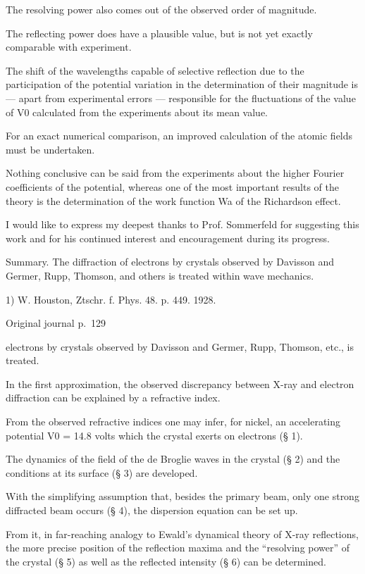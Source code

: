 \documentclass[10pt]{article}
\newcommand{\origpage}[1]{\par\medskip\noindent\hfill{\small\color{notegray}Original journal p.~#1}\hfill\mbox{}\par\smallskip}
\begin{document}
The resolving power also comes out of the observed order of magnitude.\par
The reflecting power does have a plausible value, but is not yet exactly comparable with experiment.\par
The shift of the wavelengths capable of selective reflection due to the participation of the potential variation in the determination of their magnitude is — apart from experimental errors — responsible for the fluctuations of the value of V0 calculated from the experiments about its mean value.\par
For an exact numerical comparison, an improved calculation of the atomic fields must be undertaken.\par
Nothing conclusive can be said from the experiments about the higher Fourier coefficients of the potential, whereas one of the most important results of the theory is the determination of the work function Wa of the Richardson effect.\par
I would like to express my deepest thanks to Prof. Sommerfeld for suggesting this work and for his continued interest and encouragement during its progress.\par
Summary. The diffraction of electrons by crystals observed by Davisson and Germer, Rupp, Thomson, and others is treated within wave mechanics.\par
\noindent\footnotesize 1) W. Houston, Ztschr. f. Phys. 48. p. 449. 1928.\par\normalsize
\origpage{129}
electrons by crystals observed by Davisson and Germer, Rupp, Thomson, etc., is treated.\par
In the first approximation, the observed discrepancy between X-ray and electron diffraction can be explained by a refractive index.\par
From the observed refractive indices one may infer, for nickel, an accelerating potential V0 = 14.8 volts which the crystal exerts on electrons (§ 1).\par
The dynamics of the field of the de Broglie waves in the crystal (§ 2) and the conditions at its surface (§ 3) are developed.\par
With the simplifying assumption that, besides the primary beam, only one strong diffracted beam occurs (§ 4), the dispersion equation can be set up.\par
From it, in far-reaching analogy to Ewald’s dynamical theory of X-ray reflections, the more precise position of the reflection maxima and the “resolving power” of the crystal (§ 5) as well as the reflected intensity (§ 6) can be determined.\par
\end{document}
